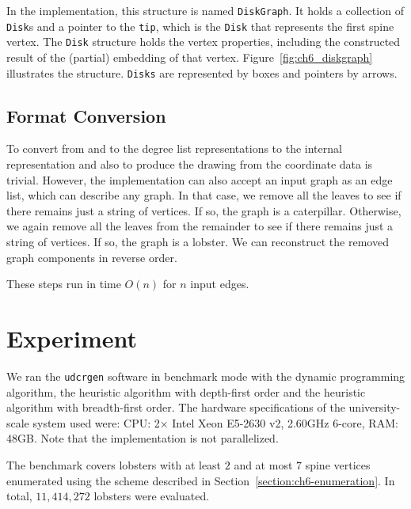 In the implementation, this structure is named \texttt{DiskGraph}. It holds a collection of \texttt{Disk}s and a pointer to the \texttt{tip}, which is the \texttt{Disk} that represents the first spine vertex. The \texttt{Disk} structure holds the vertex properties, including the constructed result of the (partial) embedding of that vertex. Figure~\ref{fig:ch6_diskgraph} illustrates the structure. \texttt{Disks} are represented by boxes and pointers by arrows.

\subsection{Format Conversion}

To convert from and to the degree list representations to the internal representation and also to produce the drawing from the coordinate data is trivial. However, the implementation can also accept an input graph as an edge list, which can describe any graph. In that case, we remove all the leaves to see if there remains just a string of vertices. If so, the graph is a caterpillar. Otherwise, we again remove all the leaves from the remainder to see if there remains just a string of vertices. If so, the graph is a lobster. We can reconstruct the removed graph components in reverse order.

These steps run in time $O(n)$ for $n$ input edges.

\section{Experiment}
\label{section:ch6-experiment}

We ran the \texttt{udcrgen} software in benchmark mode with the dynamic programming algorithm, the heuristic algorithm with depth-first order and the heuristic algorithm with breadth-first order. The hardware specifications of the university-scale system used were: CPU: 2× Intel Xeon E5-2630 v2, 2.60GHz 6-core, RAM: 48GB. Note that the implementation is not parallelized.

The benchmark covers lobsters with at least $2$ and at most $7$ spine vertices enumerated using the scheme described in Section~\ref{section:ch6-enumeration}. In total, $11,414,272$ lobsters were evaluated.

